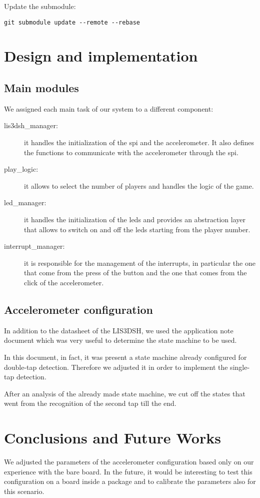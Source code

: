 Update the submodule:

\begin{verbatim}
git submodule update --remote --rebase
\end{verbatim}

\section{Design and implementation}
\subsection{Main modules}
We assigned each main task of our system to a different component:

\begin{description}
  \item [lis3dsh\_manager:] it handles the initialization of the spi and the
    accelerometer. It also defines the functions to communicate with the accelerometer through
    the spi.
  \item [play\_logic:] it allows to select the number of players and handles the logic of the game.
  \item [led\_manager:] it handles the initialization of the leds and provides an
    abstraction layer that allows to switch on and off the leds starting from
    the player number.
  \item [interrupt\_manager:] it is responsible for the management of the
    interrupts, in particular the one that come from the press of the button and
    the one that comes from the click of the accelerometer.
\end{description}

\subsection{Accelerometer configuration}
In addition to the datasheet of the LIS3DSH, we used the application note
document \cite{note} which was very useful to determine the state machine to be used.

In this document, in fact, it was present a state machine already configured for
double-tap detection.
Therefore we adjusted it in order to implement the single-tap detection.

After an analysis of the already made state machine, we cut off the states that
went from the recognition of the second tap till the end.

\section{Conclusions and Future Works}
We adjusted the parameters of the accelerometer configuration based only
on our experience with the bare board.
In the future, it would be interesting to test this configuration on a board
inside a package and to calibrate the parameters also for this scenario.